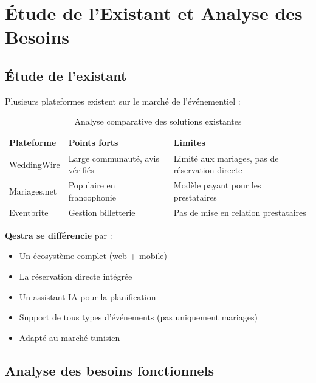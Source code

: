 \documentclass[12pt,a4paper]{report}
\begin{document}
\chapter{Étude de l'Existant et Analyse des Besoins}

\section{Étude de l'existant}
Plusieurs plateformes existent sur le marché de l'événementiel :

\begin{table}[H]
\centering
\begin{tabularx}{\textwidth}{|l|X|X|}
\hline
\textbf{Plateforme} & \textbf{Points forts} & \textbf{Limites} \\
\hline
WeddingWire & Large communauté, avis vérifiés & Limité aux mariages, pas de réservation directe \\
\hline
Mariages.net & Populaire en francophonie & Modèle payant pour les prestataires \\
\hline
Eventbrite & Gestion billetterie & Pas de mise en relation prestataires \\
\hline
\end{tabularx}
\caption{Analyse comparative des solutions existantes}
\end{table}

\textbf{Qestra se différencie} par :
\begin{itemize}
  \item Un écosystème complet (web + mobile)
  \item La réservation directe intégrée
  \item Un assistant IA pour la planification
  \item Support de tous types d'événements (pas uniquement mariages)
  \item Adapté au marché tunisien
\end{itemize}

\section{Analyse des besoins fonctionnels}
\end{document}
